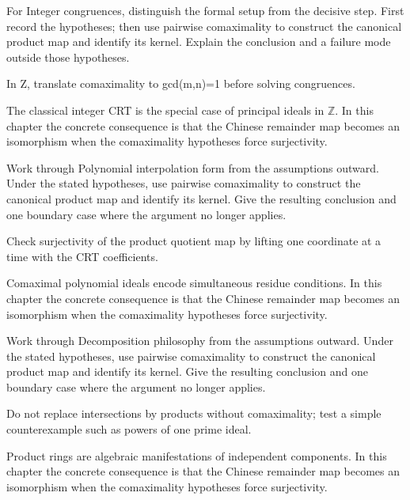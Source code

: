\begin{exercise}\label{exr:v04-06}
For Integer congruences, distinguish the formal setup from the decisive step. First record the hypotheses; then use pairwise comaximality to construct the canonical product map and identify its kernel. Explain the conclusion and a failure mode outside those hypotheses.
\end{exercise}
\begin{hint}
In Z, translate comaximality to gcd(m,n)=1 before solving congruences.
\end{hint}
\begin{solution}
The classical integer CRT is the special case of principal ideals in $\mathbb Z$. In this chapter the concrete consequence is that the Chinese remainder map becomes an isomorphism when the comaximality hypotheses force surjectivity.
\end{solution}

\begin{exercise}\label{exr:v04-07}
Work through Polynomial interpolation form from the assumptions outward. Under the stated hypotheses, use pairwise comaximality to construct the canonical product map and identify its kernel. Give the resulting conclusion and one boundary case where the argument no longer applies.
\end{exercise}
\begin{hint}
Check surjectivity of the product quotient map by lifting one coordinate at a time with the CRT coefficients.
\end{hint}
\begin{solution}
Comaximal polynomial ideals encode simultaneous residue conditions. In this chapter the concrete consequence is that the Chinese remainder map becomes an isomorphism when the comaximality hypotheses force surjectivity.
\end{solution}

\begin{exercise}\label{exr:v04-08}
Work through Decomposition philosophy from the assumptions outward. Under the stated hypotheses, use pairwise comaximality to construct the canonical product map and identify its kernel. Give the resulting conclusion and one boundary case where the argument no longer applies.
\end{exercise}
\begin{hint}
Do not replace intersections by products without comaximality; test a simple counterexample such as powers of one prime ideal.
\end{hint}
\begin{solution}
Product rings are algebraic manifestations of independent components. In this chapter the concrete consequence is that the Chinese remainder map becomes an isomorphism when the comaximality hypotheses force surjectivity.
\end{solution}

